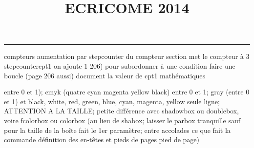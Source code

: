 \documentclass[11pt]{article}%
\title{\bf \vspace{-2cm} ECRICOME 2014} %
\author{} %
\date{} %
\renewcommand{\headrulewidth}{0pt}%
\renewcommand{\footrulewidth}{0.4pt}%
\begin{document}
\maketitle %
\vspace{-1.4cm}\hrule %
\thispagestyle{fancy}

\vspace*{.2cm}



compteurs%
aumentation par stepcounter du compteur section%
met le compteur à 3%
stepcounter{cpt1} on ajoute 1%
206) pour subordonner à une condition %
faire une boucle (page 206 aussi) %
document la valeur de cpt1 
mathématiques\newcommand{\ch}{\operatorname{ch}} 
\newcommand{\sh}{\operatorname{sh}}
\renewcommand{\tanh}{\operatorname{th}}
\renewcommand{\sinh}{\operatorname{sh}}
\renewcommand{\cosh}{\operatorname{ch}}
\newcommand{\argsh}{\operatorname{argsh}}
\newcommand{\argch}{\operatorname{argch}}
\newcommand{\argth}{\operatorname{argth}}
\newcommand{\Id}{\operatorname{Id}}
\newcommand{\id}{\operatorname{id}}
\renewcommand{\im}{\operatorname{Im}}
\renewcommand{\leq}{\leq}
\renewcommand{\geq}{\geq }

\newcommand{\dlim}{\lim}
\newcommand{\dsum}{\sum\limits}
\newcommand{\dprod}{\prod}
\newcommand{\lb}{\llbracket}
\newcommand{\rb}{\rrbracket}


entre 0 et 1); cmyk (quatre cyan magenta yellow black) entre 0 et 1;
gray (entre 0 et 1) et black, white, red, green, blue, cyan, magenta,
yellow%
seule ligne; ATTENTION A LA TAILLE; petite différence avec shadowbox ou
doublebox, voire fcolorbox ou colorbox (au lieu de shabox; laisser le
parbox tranquille sauf pour la taille de la boîte
\newcommand{\Tbox}[1]{\begin{center} \shabox{\parbox{0.8
\linewidth}{#1}} \end{center}} %
fait le 1er paramètre; entre accolades ce que fait la commande
définition des en-têtes et pieds de pages\pagestyle{fancy}
\chead{}
\rfoot[ \ \thepage]{\thepage}
\cfoot{}
\lfoot{}
\thispagestyle{fancy} %
pied de page)\renewcommand{\footrulewidth}{0.4pt}
\renewcommand{\headrulewidth}{0.4pt}
\end{document}
